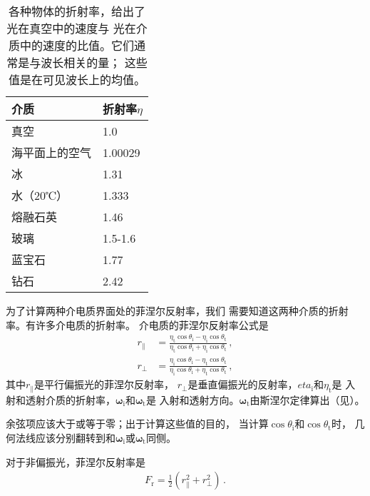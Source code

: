 \begin{table}[htbp]
    \centering
    \begin{tabular}{ll}
        \toprule
        \textbf{介质}  & \textbf{折射率}$\eta$ \\
        \midrule
        真空           & 1.0                   \\
        海平面上的空气 & 1.00029               \\
        冰             & 1.31                  \\
        水（20℃）      & 1.333                 \\
        熔融石英       & 1.46                  \\
        玻璃           & 1.5-1.6               \\
        蓝宝石         & 1.77                  \\
        钻石           & 2.42                  \\
        \bottomrule
    \end{tabular}
    \caption{各种物体的折射率，给出了光在真空中的速度与
        光在介质中的速度的比值。它们通常是与波长相关的量；
        这些值是在可见波长上的均值。}
    \label{tab:8.1}
\end{table}

为了计算两种介电质界面处的菲涅尔反射率，我们
需要知道这两种介质的折射率。有许多介电质的折射率。
介电质的菲涅尔反射率公式是
\begin{align*}
    r_{\parallel} & =\frac{\eta_{\mathrm{t}}\cos\theta_{\mathrm{i}}-\eta_{\mathrm{i}}\cos\theta_{\mathrm{t}}}{\eta_{\mathrm{t}}\cos\theta_{\mathrm{i}}+\eta_{\mathrm{i}}\cos\theta_{\mathrm{t}}}\, , \\
    r_{\perp}     & =\frac{\eta_{\mathrm{i}}\cos\theta_{\mathrm{i}}-\eta_{\mathrm{t}}\cos\theta_{\mathrm{t}}}{\eta_{\mathrm{i}}\cos\theta_{\mathrm{i}}+\eta_{\mathrm{t}}\cos\theta_{\mathrm{t}}}\, ,
\end{align*}
其中$r_{\parallel}$是平行偏振光的菲涅尔反射率，
$r_{\perp}$是垂直偏振光的反射率，$eta_{\mathrm{i}}$和$\eta_{\mathrm{t}}$是
入射和透射介质的折射率，$\bm\omega_{\mathrm{i}}$和$\bm\omega_{\mathrm{t}}$是
入射和透射方向。$\bm\omega_{\mathrm{t}}$由斯涅尔定律算出（见）。

余弦项应该大于或等于零；出于计算这些值的目的，
当计算$\cos\theta_{\mathrm{i}}$和$\cos\theta_{\mathrm{t}}$时，
几何法线应该分别翻转到和$\bm\omega_{\mathrm{i}}$或$\bm\omega_{\mathrm{t}}$同侧。

对于非偏振光，菲涅尔反射率是
\begin{align*}
    F_{\mathrm{r}}=\frac{1}{2}(r_{\parallel}^2+r_{\perp}^2)\, .
\end{align*}


